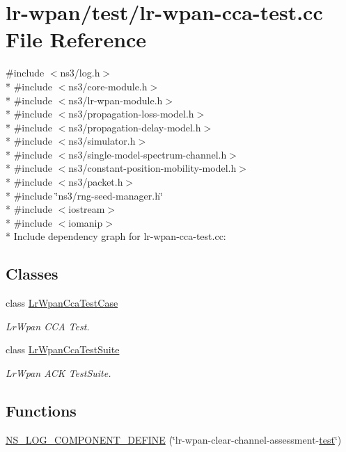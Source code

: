 \hypertarget{lr-wpan-cca-test_8cc}{}\section{lr-\/wpan/test/lr-\/wpan-\/cca-\/test.cc File Reference}
\label{lr-wpan-cca-test_8cc}
{\ttfamily \#include $<$ns3/log.\+h$>$}\\*
{\ttfamily \#include $<$ns3/core-\/module.\+h$>$}\\*
{\ttfamily \#include $<$ns3/lr-\/wpan-\/module.\+h$>$}\\*
{\ttfamily \#include $<$ns3/propagation-\/loss-\/model.\+h$>$}\\*
{\ttfamily \#include $<$ns3/propagation-\/delay-\/model.\+h$>$}\\*
{\ttfamily \#include $<$ns3/simulator.\+h$>$}\\*
{\ttfamily \#include $<$ns3/single-\/model-\/spectrum-\/channel.\+h$>$}\\*
{\ttfamily \#include $<$ns3/constant-\/position-\/mobility-\/model.\+h$>$}\\*
{\ttfamily \#include $<$ns3/packet.\+h$>$}\\*
{\ttfamily \#include \char`\"{}ns3/rng-\/seed-\/manager.\+h\char`\"{}}\\*
{\ttfamily \#include $<$iostream$>$}\\*
{\ttfamily \#include $<$iomanip$>$}\\*
Include dependency graph for lr-\/wpan-\/cca-\/test.cc\+:
\subsection*{Classes}
\begin{DoxyCompactItemize}
\item 
class \hyperlink{classLrWpanCcaTestCase}{Lr\+Wpan\+Cca\+Test\+Case}
\begin{DoxyCompactList}\small\item\em Lr\+Wpan C\+CA Test. \end{DoxyCompactList}\item 
class \hyperlink{classLrWpanCcaTestSuite}{Lr\+Wpan\+Cca\+Test\+Suite}
\begin{DoxyCompactList}\small\item\em Lr\+Wpan A\+CK Test\+Suite. \end{DoxyCompactList}\end{DoxyCompactItemize}
\subsection*{Functions}
\begin{DoxyCompactItemize}
\item 
\hyperlink{lr-wpan-cca-test_8cc_a84f4d69f4b80528d8ffeb47ce770cf61}{N\+S\+\_\+\+L\+O\+G\+\_\+\+C\+O\+M\+P\+O\+N\+E\+N\+T\+\_\+\+D\+E\+F\+I\+NE} (\char`\"{}lr-\/wpan-\/clear-\/channel-\/assessment-\/\hyperlink{main-test-sync_8cc_a708a4c1a4d0c4acc4c447310dd4db27f}{test}\char`\"{})
\end{DoxyCompactItemize}
